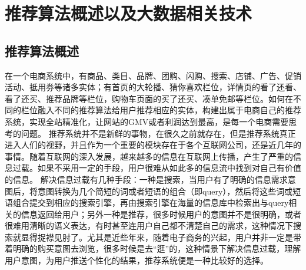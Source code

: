 \chapter{推荐算法概述以及大数据相关技术}

\section{推荐算法概述}
在一个电商系统中，有商品、类目、品牌、团购、闪购、搜索、店铺、广告、促销活动、抵用券等诸多实体；有首页的大轮播、猜你喜欢栏位，详情页的看了还看、看了还买、推荐品牌等栏位，购物车页面的买了还买、凑单免邮等栏位。如何在不同的栏位融入不同的推荐算法给用户推荐相应的实体，构建出属于电商自己的推荐系统，实现全站精准化，让网站的GMV或者利润达到最高，是每一个电商需要思考的问题。
推荐系统并不是新鲜的事物，在很久之前就存在，但是推荐系统真正进入人们的视野，并且作为一个重要的模块存在于各个互联网公司，还是近几年的事情。随着互联网的深入发展，越来越多的信息在互联网上传播，产生了严重的信息过载。如果不采用一定的手段，用户很难从如此多的信息流中找到对自己有价值的信息。
解决信息过载有几种手段：一种是搜索，当用户有了明确的信息需求意图后，将意图转换为几个简短的词或者短语的组合（即query），然后将这些词或短语组合提交到相应的搜索引擎，再由搜索引擎在海量的信息库中检索出与query相关的信息返回给用户；另外一种是推荐，很多时候用户的意图并不是很明确，或者很难用清晰的语义表达，有时甚至连用户自己都不清楚自己的需求，这种情况下搜索就显得捉襟见肘了。尤其是近些年来，随着电子商务的兴起，用户并非一定是带着明确的购买意图去浏览，很多时候是去“逛”的，这种情景下解决信息过载，理解用户意图，为用户推送个性化的结果，推荐系统便是一种比较好的选择。

